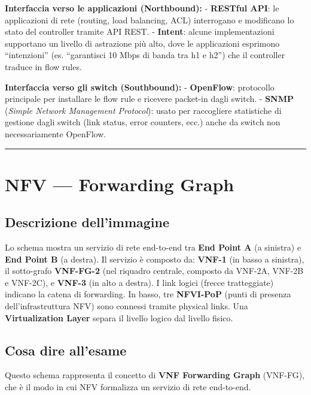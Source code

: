 \documentclass[
  italian,
  openany]{book}
\begin{document}
\textbf{Interfaccia verso le applicazioni (Northbound):} -
\textbf{RESTful API}: le applicazioni di rete (routing, load balancing,
ACL) interrogano e modificano lo stato del controller tramite API REST.
- \textbf{Intent}: alcune implementazioni supportano un livello di
astrazione più alto, dove le applicazioni esprimono ``intenzioni'' (es.
``garantisci 10 Mbps di banda tra h1 e h2'') che il controller traduce
in flow rules.

\textbf{Interfaccia verso gli switch (Southbound):} - \textbf{OpenFlow}:
protocollo principale per installare le flow rule e ricevere packet-in
dagli switch. - \textbf{SNMP} (\emph{Simple Network Management
Protocol}): usato per raccogliere statistiche di gestione dagli switch
(link status, error counters, ecc.) anche da switch non necessariamente
OpenFlow.

\begin{center}\rule{0.5\linewidth}{0.5pt}\end{center}

\section{NFV --- Forwarding Graph}\label{nfv-forwarding-graph}

\subsection{Descrizione
dell'immagine}\label{descrizione-dellimmagine-11}

Lo schema mostra un servizio di rete end-to-end tra \textbf{End Point A}
(a sinistra) e \textbf{End Point B} (a destra). Il servizio è composto
da: \textbf{VNF-1} (in basso a sinistra), il sotto-grafo
\textbf{VNF-FG-2} (nel riquadro centrale, composto da VNF-2A, VNF-2B e
VNF-2C), e \textbf{VNF-3} (in alto a destra). I link logici (frecce
tratteggiate) indicano la catena di forwarding. In basso, tre
\textbf{NFVI-PoP} (punti di presenza dell'infrastruttura NFV) sono
connessi tramite physical links. Una \textbf{Virtualization Layer}
separa il livello logico dal livello fisico.

\subsection{Cosa dire all'esame}\label{cosa-dire-allesame-11}

Questo schema rappresenta il concetto di \textbf{VNF Forwarding Graph}
(VNF-FG), che è il modo in cui NFV formalizza un servizio di rete
end-to-end.
\end{document}
